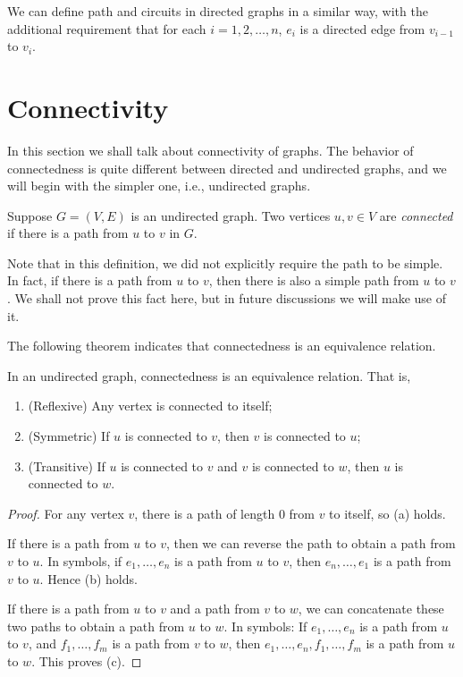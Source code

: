 We can define path and circuits in directed graphs in a similar way, with the additional requirement that for each $i=1,2,\dots,n$, $e_i$ is a directed edge from $v_{i-1}$ to $v_i$.

\section{Connectivity}\label{sec:Connectivity}
In this section we shall talk about connectivity of graphs. The behavior of connectedness is quite different between directed and undirected graphs, and we will begin with the simpler one, i.e., undirected graphs. 

\begin{definition}
    Suppose $G=(V,E)$ is an undirected graph. Two vertices $u,v\in V$ are \emph{connected} if there is a path from $u$ to $v$ in $G$. 
\end{definition}

Note that in this definition, we did not explicitly require the path to be simple. In fact, if there is a path from $u$ to $v$, then there is also a simple path from $u$ to $v$. We shall not prove this fact here, but in future discussions we will make use of it. 

The following theorem indicates that connectedness is an equivalence relation.

\begin{theorem}
    In an undirected graph, connectedness is an equivalence relation. That is, 
    \begin{enumerate}[itemindent=0ex, itemsep=0pt, label=\upshape{(\alph*)}]
        \item (Reflexive) Any vertex is connected to itself;
        \item (Symmetric) If $u$ is connected to $v$, then $v$ is connected to $u$;
        \item (Transitive) If $u$ is connected to $v$ and $v$ is connected to $w$, then $u$ is connected to $w$.
    \end{enumerate}
\end{theorem}

\begin{proof}
    For any vertex $v$, there is a path of length $0$ from $v$ to itself, so (a) holds.

    If there is a path from $u$ to $v$, then we can reverse the path to obtain a path from $v$ to $u$. In symbols, if $e_1,\dots,e_n$ is a path from $u$ to $v$, then $e_n,\dots,e_1$ is a path from $v$ to $u$. Hence (b) holds.

    If there is a path from $u$ to $v$ and a path from $v$ to $w$, we can concatenate these two paths to obtain a path from $u$ to $w$. In symbols: If $e_1,\dots,e_n$ is a path from $u$ to $v$, and $f_1,\dots,f_m$ is a path from $v$ to $w$, then $e_1,\dots,e_n,f_1,\dots,f_m$ is a path from $u$ to $w$. This proves (c).
\end{proof}

